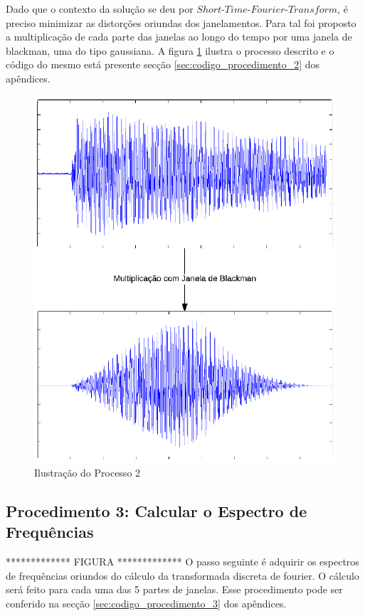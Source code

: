 Dado que o contexto da solução se deu por $Short$-$Time$-$Fourier$-$Transform$, é preciso minimizar as distorções oriundas dos janelamentos. Para tal foi proposto a multiplicação de cada parte das janelas ao longo do tempo por uma janela de blackman, uma do tipo gaussiana. A figura \ref{fig:procedimento_2} ilustra o processo descrito e o código do mesmo está presente secção \ref{sec:codigo_procedimento_2} dos apêndices.

\begin{figure}[h] 
  \centering
    \includegraphics[keepaspectratio=true, scale=0.7]{figuras/procedimento_2}
    \caption{Ilustração do Processo 2}
    \label{fig:procedimento_2}
\end{figure}

\subsection{Procedimento 3: Calcular o Espectro de Frequências}
\label{subsec:procedimento_3}

************* FIGURA *************
O passo seguinte é adquirir os espectros de frequências oriundos do cálculo da transformada discreta de fourier. O cálculo será feito para cada uma das 5 partes de janelas. Esse procedimento pode ser conferido na secção \ref{sec:codigo_procedimento_3} dos apêndices.



